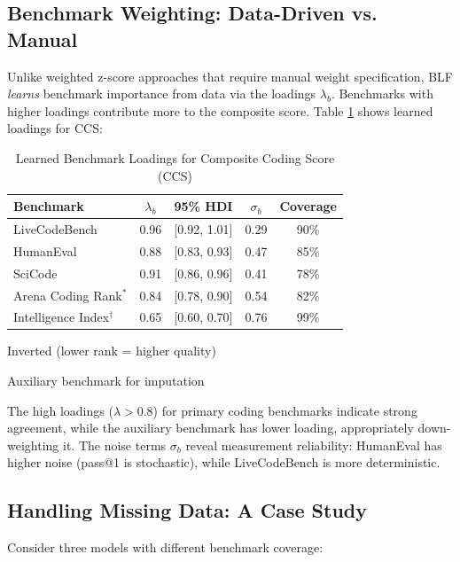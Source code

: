 \subsection{Benchmark Weighting: Data-Driven vs. Manual}

Unlike weighted z-score approaches that require manual weight specification, BLF \textit{learns} benchmark importance from data via the loadings $\lambda_b$. Benchmarks with higher loadings contribute more to the composite score. Table \ref{tab:loadings} shows learned loadings for CCS:

\begin{table}[h]
\centering
\caption{Learned Benchmark Loadings for Composite Coding Score (CCS)}
\label{tab:loadings}
\begin{tabular}{lcccc}
\toprule
\textbf{Benchmark} & \textbf{$\lambda_b$} & \textbf{95\% HDI} & \textbf{$\sigma_b$} & \textbf{Coverage} \\
\midrule
LiveCodeBench     & 0.96 & [0.92, 1.01] & 0.29 & 90\% \\
HumanEval         & 0.88 & [0.83, 0.93] & 0.47 & 85\% \\
SciCode           & 0.91 & [0.86, 0.96] & 0.41 & 78\% \\
Arena Coding Rank$^*$ & 0.84 & [0.78, 0.90] & 0.54 & 82\% \\
Intelligence Index$^\dagger$ & 0.65 & [0.60, 0.70] & 0.76 & 99\% \\
\bottomrule
\end{tabular}
\begin{tablenotes}
\item[*] Inverted (lower rank = higher quality)
\item[$^\dagger$] Auxiliary benchmark for imputation
\end{tablenotes}
\end{table}

The high loadings ($\lambda > 0.8$) for primary coding benchmarks indicate strong agreement, while the auxiliary benchmark has lower loading, appropriately down-weighting it. The noise terms $\sigma_b$ reveal measurement reliability: HumanEval has higher noise (pass@1 is stochastic), while LiveCodeBench is more deterministic.

\subsection{Handling Missing Data: A Case Study}

Consider three models with different benchmark coverage:

